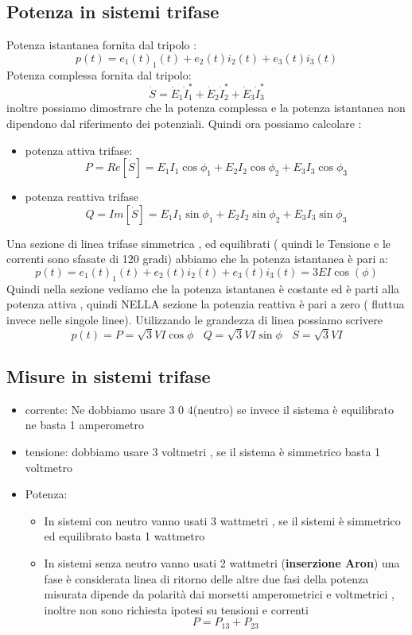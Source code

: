 \documentclass{article}
\theoremstyle{definition}
\begin{document}
\subsection{Potenza in sistemi trifase}
Potenza istantanea fornita dal tripolo :
$$p(t)=e_1(t)_1(t)+e_2(t)i_2(t)+e_3(t)i_3(t) $$
Potenza complessa fornita dal tripolo:
$$\dot{S}=\dot{E}_1\dot{I}_1^*+\dot{E}_2\dot{I}_2^*+\dot{E}_3\dot{I}_3^*$$ inoltre possiamo dimostrare che la potenza complessa e la potenza istantanea non dipendono dal riferimento dei potenziali.
Quindi ora possiamo calcolare :
\begin{itemize}
    \item potenza attiva trifase:
$$P=Re[\dot{S}]=E_1I_1\cos{\phi_1}+E_2I_2\cos{\phi_2}+E_3I_3\cos{\phi_3}$$
    \item potenza reattiva trifase
    $$Q=Im[\dot{S}]=E_1I_1\sin{\phi_1}+E_2I_2\sin{\phi_2}+E_3I_3\sin{\phi_3}$$
\end{itemize}
Una sezione di linea trifase simmetrica , ed equilibrati ( quindi le Tensione e le correnti sono sfasate di 120 gradi) abbiamo che la potenza istantanea è pari a:
$$p(t)=e_1(t)_1(t)+e_2(t)i_2(t)+e_3(t)i_3(t)=3EI\cos(\phi)$$
Quindi nella sezione vediamo che la potenza istantanea è costante ed è parti alla potenza attiva , quindi NELLA sezione la potenzia reattiva è pari a zero ( fluttua invece nelle singole linee).
Utilizzando le grandezza di linea possiamo scrivere 
$$p(t)=P=\sqrt{3}VI\cos{\phi} \ \ \ \ Q=\sqrt{3}VI\sin{\phi}\ \ \ \ S=\sqrt{3}VI$$
\subsection{Misure in sistemi trifase}
\begin{itemize}
    \item corrente: Ne dobbiamo usare 3 0 4(neutro) se invece il sistema è equilibrato ne basta 1 amperometro
    \item tensione: dobbiamo usare 3 voltmetri , se il sistema è simmetrico basta 1 voltmetro 
    \item Potenza: 
   \begin{itemize}
       \item  In sistemi con neutro vanno usati 3 wattmetri , se il sistemi è simmetrico ed equilibrato basta 1 wattmetro
       \item In sistemi senza neutro vanno usati 2 wattmetri (\textbf{inserzione Aron}) una fase è considerata linea di ritorno delle altre due fasi della potenza misurata dipende da polarità dai morsetti amperometrici e voltmetrici , inoltre non sono richiesta ipotesi su tensioni e correnti 
       $$P=P_{13}+P_{23}$$
   \end{itemize}
\end{itemize}
\end{document}
